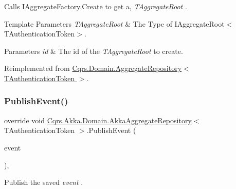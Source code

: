 Calls I\+Aggregate\+Factory.\+Create to get a, {\itshape T\+Aggregate\+Root} . 


\begin{DoxyTemplParams}{Template Parameters}
{\em T\+Aggregate\+Root} & The Type of I\+Aggregate\+Root$<$\+T\+Authentication\+Token$>$.\\
\hline
\end{DoxyTemplParams}

\begin{DoxyParams}{Parameters}
{\em id} & The id of the {\itshape T\+Aggregate\+Root}  to create.\\
\hline
\end{DoxyParams}


Reimplemented from \hyperlink{classCqrs_1_1Domain_1_1AggregateRepository_a64d82c57bbe49a11bd5cf20c5b86ce19_a64d82c57bbe49a11bd5cf20c5b86ce19}{Cqrs.\+Domain.\+Aggregate\+Repository$<$ T\+Authentication\+Token $>$}.

\mbox{\label{classCqrs_1_1Akka_1_1Domain_1_1AkkaAggregateRepository_a144cbfdedb23039729ba5b3058f84e7a_a144cbfdedb23039729ba5b3058f84e7a}} 
\subsubsection{\texorpdfstring{Publish\+Event()}{PublishEvent()}}
{\footnotesize\ttfamily override void \hyperlink{classCqrs_1_1Akka_1_1Domain_1_1AkkaAggregateRepository}{Cqrs.\+Akka.\+Domain.\+Akka\+Aggregate\+Repository}$<$ T\+Authentication\+Token $>$.Publish\+Event (\begin{DoxyParamCaption}\item[{\hyperlink{interfaceCqrs_1_1Events_1_1IEvent}{I\+Event}$<$ T\+Authentication\+Token $>$ @}]{event }\end{DoxyParamCaption})\hspace{0.3cm}{\ttfamily [protected]}, {\ttfamily [virtual]}}



Publish the saved {\itshape event} . 



